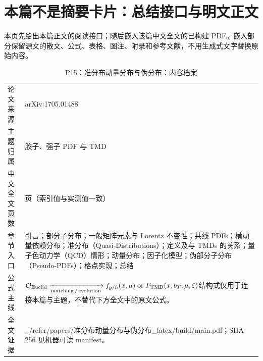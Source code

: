 \documentclass[UTF8,11pt,oneside]{ctexbook}
\begin{document}
\section*{本篇不是摘要卡片：总结接口与明文正文}
本页先给出本篇正文的阅读接口；随后嵌入该篇中文全文的已构建 PDF。嵌入部分保留源文的散文、公式、表格、图注、附录和参考文献，不用生成式文字替换原始内容。
\begin{table}[htbp]
  \centering
  \caption{P15：准分布动量分布与伪分布：内容档案}
  \small
  \begin{tabularx}{0.96\textwidth}{@{}p{3.3cm}>{\raggedright\arraybackslash}X@{}}
    \toprule
    论文来源 & arXiv:1705.01488 \\
    主题归属 & 胶子、强子 PDF 与 TMD \\
    中文全文页数 & 9 页（索引值与实测值一致） \\
    章节入口 & 引言；部分子分布；一般矩阵元素与 Lorentz 不变性；共线 PDFs；横动量依赖分布；准分布（Quasi-Distributions）；定义及与 TMDs 的关系；量子色动力学（QCD）情形；动量分布；因子化模型；伪部分子分布（Pseudo-PDFs）；格点实现；总结 \\
    公式主线 & $\mathcal O_{\rm Euclid}\xrightarrow[\rm matching\,/\,evolution]{}f_{g/h}(x,\mu)\;{\rm or}\;F_{\rm TMD}(x,b_T,\mu,\zeta)$\newline\scriptsize 结构式仅用于连接本篇与主题，不替代下方全文中的原文公式。 \\
    全文证据 & ../\allowbreak{}refer/\allowbreak{}papers/\allowbreak{}准分布动量分布与伪分布\_\allowbreak{}latex/\allowbreak{}build/\allowbreak{}main.pdf；SHA-256 见机器可读 manifest。 \\
    \bottomrule
  \end{tabularx}
\end{table}
\end{document}
